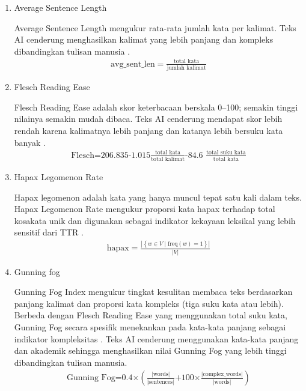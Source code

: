 \begin{enumerate}[label=\arabic*., leftmargin=*]
  \item Average Sentence Length
  
  Average Sentence Length mengukur rata-rata jumlah kata per kalimat. Teks AI cenderung menghasilkan kalimat yang lebih panjang dan kompleks dibandingkan tulisan manusia \cite{Analysis}.
  \begin{equation}
  \label{eq:21}
  \begin{split}
  \mathrm{avg}\_\mathrm{sent}\_\mathrm{len}=\frac{\text{total\ kata}}{\text{jumlah\ kalimat}}
  \end{split}
  \end{equation}

  \item Flesch Reading Ease
  
  Flesch Reading Ease adalah skor keterbacaan berskala 0–100; semakin tinggi nilainya semakin mudah dibaca. Teks AI cenderung mendapat skor lebih rendah karena kalimatnya lebih panjang dan katanya lebih bersuku kata banyak \cite{Analysis}.
  \begin{equation}
  \label{eq:22}
  \begin{split}
  \text{Flesch=206.835-1.015}\frac{\text{total\ kata}}{\text{total\ kalimat}}\text{-84.6\ }\frac{\text{total\ suku\ kata}}{\text{total\ kata}}
  \end{split}
  \end{equation}

  \item Hapax Legomenon Rate
  
  Hapax legomenon adalah kata yang hanya muncul tepat satu kali dalam teks. Hapax Legomenon Rate mengukur proporsi kata hapax terhadap total kosakata unik dan digunakan sebagai indikator kekayaan leksikal yang lebih sensitif dari TTR \cite{Tschuggnall2015}\cite{Analysis}.
  \begin{equation}
  \label{eq:23}
  \begin{split}
  \mathrm{hapax}=\frac{\left|\left\{w\in V\mid \mathrm{freq}\left(w\right)=1\right\}\right|}{\left|V\right|}
  \end{split}
  \end{equation}

  \item Gunning fog
  
  Gunning Fog Index mengukur tingkat kesulitan membaca teks berdasarkan panjang kalimat dan proporsi kata kompleks (tiga suku kata atau lebih). Berbeda dengan Flesch Reading Ease yang menggunakan total suku kata, Gunning Fog secara spesifik menekankan pada kata-kata panjang sebagai indikator kompleksitas \cite{Analysis}. Teks AI cenderung menggunakan kata-kata panjang dan akademik sehingga menghasilkan nilai Gunning Fog yang lebih tinggi dibandingkan tulisan manusia.
  \begin{equation}
  \label{eq:24}
  \begin{split}
  \text{Gunning\ Fog=0.4×}\left(\frac{\left|\text{words}\right|}{\left|\text{sentences}\right|}\text{+100×}\frac{\left|\text{complex\_words}\right|}{\left|\text{words}\right|}\right)
  \end{split}
  \end{equation}


\end{enumerate}
